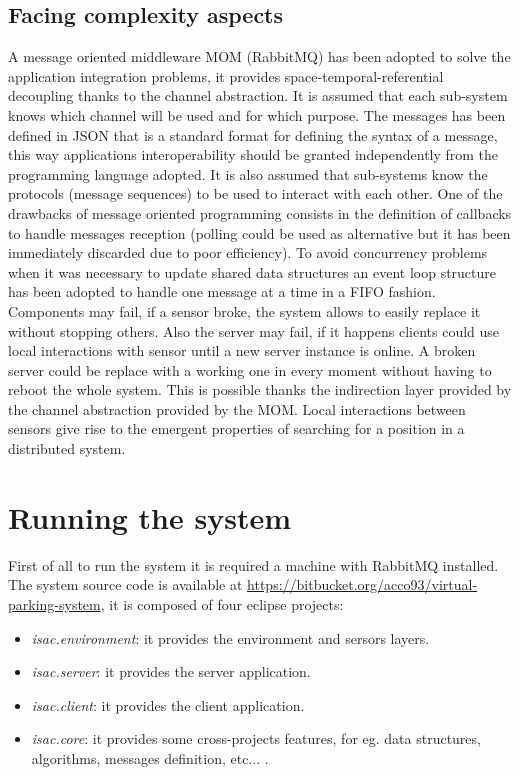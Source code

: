 \documentclass[11pt]{article}
\begin{document}
\subsection{Facing complexity aspects}
A message oriented middleware MOM (RabbitMQ) has been adopted to solve the application integration problems, it provides space-temporal-referential decoupling thanks to the channel abstraction. It is assumed that each sub-system knows which channel will be used and for which purpose. The messages has been defined in JSON that is a standard format for defining the syntax of a message, this way applications interoperability should be granted independently from the programming language adopted. It is also assumed that sub-systems know the protocols (message sequences) to be used to interact with each other. One of the drawbacks of message oriented programming consists in the definition of callbacks to handle messages reception (polling could be used as alternative but it has been immediately discarded due to poor efficiency). To avoid concurrency problems when it was necessary to update shared data structures an event loop structure has been adopted to handle one message at a time in a FIFO fashion. Components may fail, if a sensor broke, the system allows to easily replace it without stopping others. Also the server may fail, if it happens clients could use local interactions with sensor until a new server instance is online. A broken server could be replace with a working one in every moment without having to reboot the whole system. This is possible thanks the indirection layer provided by the channel abstraction provided by the MOM. Local interactions between sensors give rise to the emergent properties of searching for a position in a distributed system.

\section{Running the system}
First of all to run the system it is required a machine with RabbitMQ installed. The system source code is available at \url{https://bitbucket.org/acco93/virtual-parking-system}, it is composed of four eclipse projects:
\begin{itemize}
\item \emph{isac.environment}: it provides the environment and sersors layers.
\item \emph{isac.server}: it provides the server application.
\item \emph{isac.client}: it provides the client application.
\item \emph{isac.core}: it provides some cross-projects features, for eg. data structures, algorithms, messages definition, etc... .
\end{itemize}
\end{document}
